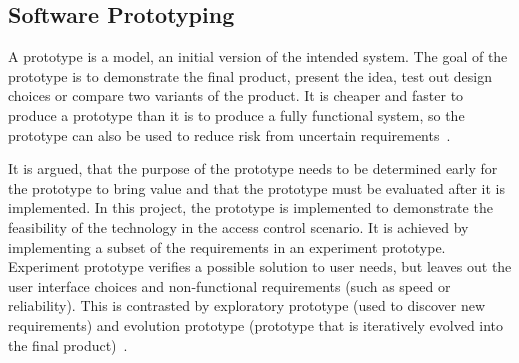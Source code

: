 \subsection{Software Prototyping}\label{sec:methodology-prototype}
A prototype is a model, an initial version of the intended system. The goal of the prototype is to demonstrate the final product, present the idea, test out design choices or compare two variants of the product. It is cheaper and faster to produce a prototype than it is to produce a fully functional system, so the prototype can also be used to reduce risk from uncertain requirements~\cite{Sommerville2011SoftwareEngineering, Davis1995SoftwarePrototyping}.

It is argued, that the purpose of the prototype needs to be determined early for the prototype to bring value and that the prototype must be evaluated after it is implemented. In this project, the prototype is implemented to demonstrate the feasibility of the technology in the access control scenario. It is achieved by implementing a subset of the requirements in an experiment prototype. Experiment prototype verifies a possible solution to user needs, but leaves out the user interface choices and non-functional requirements (such as speed or reliability). This is contrasted by exploratory prototype (used to discover new requirements) and evolution prototype (prototype that is iteratively evolved into the final product)~\cite{Davis1995SoftwarePrototyping}.